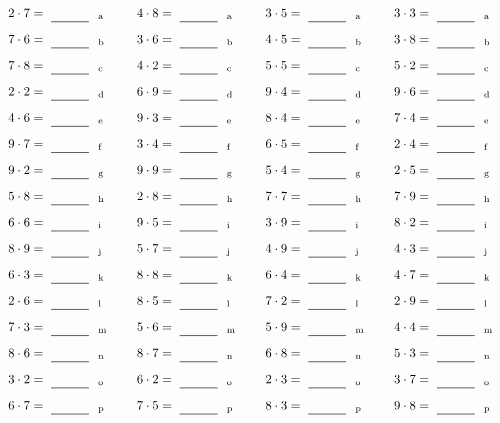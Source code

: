 \documentclass
[
  draft    = true,
  fontsize = 11pt,
  parskip  = half-
]
{scrartcl}
\begin{document}
\par\vfill\par
\begin{align*}
    \pline{2\cdot7}&=\rline{a}
  & \pline{4\cdot8}&=\rline{a}
  & \pline{3\cdot5}&=\rline{a}
  & \pline{3\cdot3}&=\rline{a} \\[1ex]
    \pline{7\cdot6}&=\rline{b}
  & \pline{3\cdot6}&=\rline{b}
  & \pline{4\cdot5}&=\rline{b}
  & \pline{3\cdot8}&=\rline{b} \\[1ex]
    \pline{7\cdot8}&=\rline{c}
  & \pline{4\cdot2}&=\rline{c}
  & \pline{5\cdot5}&=\rline{c}
  & \pline{5\cdot2}&=\rline{c} \\[1ex]
    \pline{2\cdot2}&=\rline{d}
  & \pline{6\cdot9}&=\rline{d}
  & \pline{9\cdot4}&=\rline{d}
  & \pline{9\cdot6}&=\rline{d} \\[1ex]
    \pline{4\cdot6}&=\rline{e}
  & \pline{9\cdot3}&=\rline{e}
  & \pline{8\cdot4}&=\rline{e}
  & \pline{7\cdot4}&=\rline{e} \\[1ex]
    \pline{9\cdot7}&=\rline{f}
  & \pline{3\cdot4}&=\rline{f}
  & \pline{6\cdot5}&=\rline{f}
  & \pline{2\cdot4}&=\rline{f} \\[1ex]
    \pline{9\cdot2}&=\rline{g}
  & \pline{9\cdot9}&=\rline{g}
  & \pline{5\cdot4}&=\rline{g}
  & \pline{2\cdot5}&=\rline{g} \\[1ex]
    \pline{5\cdot8}&=\rline{h}
  & \pline{2\cdot8}&=\rline{h}
  & \pline{7\cdot7}&=\rline{h}
  & \pline{7\cdot9}&=\rline{h} \\[1ex]
    \pline{6\cdot6}&=\rline{i}
  & \pline{9\cdot5}&=\rline{i}
  & \pline{3\cdot9}&=\rline{i}
  & \pline{8\cdot2}&=\rline{i} \\[1ex]
    \pline{8\cdot9}&=\rline{j}
  & \pline{5\cdot7}&=\rline{j}
  & \pline{4\cdot9}&=\rline{j}
  & \pline{4\cdot3}&=\rline{j} \\[1ex]
    \pline{6\cdot3}&=\rline{k}
  & \pline{8\cdot8}&=\rline{k}
  & \pline{6\cdot4}&=\rline{k}
  & \pline{4\cdot7}&=\rline{k} \\[1ex]
    \pline{2\cdot6}&=\rline{l}
  & \pline{8\cdot5}&=\rline{l}
  & \pline{7\cdot2}&=\rline{l}
  & \pline{2\cdot9}&=\rline{l} \\[1ex]
    \pline{7\cdot3}&=\rline{m}
  & \pline{5\cdot6}&=\rline{m}
  & \pline{5\cdot9}&=\rline{m}
  & \pline{4\cdot4}&=\rline{m} \\[1ex]
    \pline{8\cdot6}&=\rline{n}
  & \pline{8\cdot7}&=\rline{n}
  & \pline{6\cdot8}&=\rline{n}
  & \pline{5\cdot3}&=\rline{n} \\[1ex]
    \pline{3\cdot2}&=\rline{o}
  & \pline{6\cdot2}&=\rline{o}
  & \pline{2\cdot3}&=\rline{o}
  & \pline{3\cdot7}&=\rline{o} \\[1ex]
    \pline{6\cdot7}&=\rline{p}
  & \pline{7\cdot5}&=\rline{p}
  & \pline{8\cdot3}&=\rline{p}
  & \pline{9\cdot8}&=\rline{p}
\end{align*}
\end{document}
